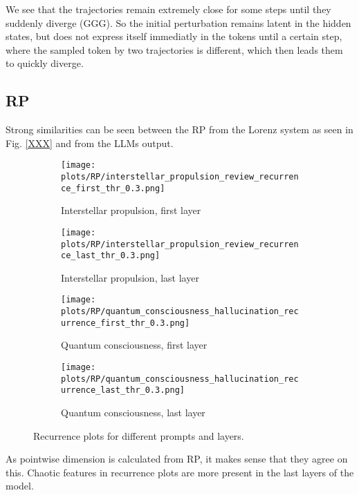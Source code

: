 \documentclass[a4paper,12pt]{article}
\begin{document}
We see that the trajectories remain extremely close for some steps until they suddenly diverge (GGG). So the initial perturbation remains latent in the hidden states, but does not express itself immediatly in the tokens until a certain step, where the sampled token by two trajectories is different, which then leads them to quickly diverge.

\subsection{RP}

Strong similarities can be seen between the RP from the Lorenz \cite{DeterministicNonperiodicFlow} system as seen in Fig. \ref{XXX} and from the LLMs output. %


\begin{figure}[H]
    \centering
    \begin{subfigure}[b]{0.48\linewidth}
        \centering
        \texttt{[image: plots/RP/interstellar\_propulsion\_review\_recurrence\_first\_thr\_0.3.png]}
        \caption{Interstellar propulsion, first layer}
    \end{subfigure}\hfill
    \begin{subfigure}[b]{0.48\linewidth}
        \centering
        \texttt{[image: plots/RP/interstellar\_propulsion\_review\_recurrence\_last\_thr\_0.3.png]}
        \caption{Interstellar propulsion, last layer}
    \end{subfigure}
    \begin{subfigure}[b]{0.48\linewidth}
        \centering
        \texttt{[image: plots/RP/quantum\_consciousness\_hallucination\_recurrence\_first\_thr\_0.3.png]}
        \caption{Quantum consciousness, first layer}
    \end{subfigure}\hfill
    \begin{subfigure}[b]{0.48\linewidth}
        \centering
        \texttt{[image: plots/RP/quantum\_consciousness\_hallucination\_recurrence\_last\_thr\_0.3.png]}
        \caption{Quantum consciousness, last layer}
    \end{subfigure}
    \caption{Recurrence plots for different prompts and layers.}
    \label{fig:rp_comparison}
\end{figure}

As pointwise dimension is calculated from RP, it makes sense that they agree on this.
Chaotic features in recurrence plots are more present in the last layers of the model. 
\end{document}
